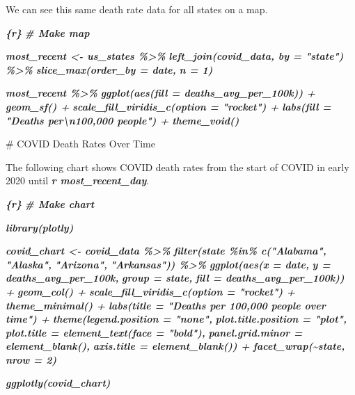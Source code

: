 \documentclass[
]{book}
\newenvironment{Shaded}{\begin{snugshade}}{\end{snugshade}}
\newcommand{\FunctionTok}[1]{\textcolor[rgb]{0.00,0.00,0.00}{#1}}
\newcommand{\InformationTok}[1]{\textcolor[rgb]{0.56,0.35,0.01}{\textbf{\textit{#1}}}}
\newcommand{\NormalTok}[1]{#1}
\begin{document}
\begin{Shaded}
\begin{Highlighting}[]
\NormalTok{We can see this same death rate data for all states on a map.}

\InformationTok{\textasciigrave{}\textasciigrave{}\textasciigrave{}\{r\}}
\InformationTok{\# Make map}

\InformationTok{most\_recent \textless{}{-} us\_states \%\textgreater{}\% }
\InformationTok{  left\_join(covid\_data, by = "state") \%\textgreater{}\% }
\InformationTok{  slice\_max(order\_by = date,}
\InformationTok{            n = 1) }

\InformationTok{most\_recent \%\textgreater{}\% }
\InformationTok{  ggplot(aes(fill = deaths\_avg\_per\_100k)) +}
\InformationTok{  geom\_sf() +}
\InformationTok{  scale\_fill\_viridis\_c(option = "rocket") +}
\InformationTok{  labs(fill = "Deaths per\textbackslash{}n100,000 people") +}
\InformationTok{  theme\_void()}
\InformationTok{\textasciigrave{}\textasciigrave{}\textasciigrave{}}

\FunctionTok{\# COVID Death Rates Over Time}

\NormalTok{The following chart shows COVID death rates from the start of COVID in early 2020 until }\InformationTok{\textasciigrave{}r most\_recent\_day\textasciigrave{}}\NormalTok{.}

\InformationTok{\textasciigrave{}\textasciigrave{}\textasciigrave{}\{r\}}
\InformationTok{\# Make chart}

\InformationTok{library(plotly)}

\InformationTok{covid\_chart \textless{}{-} covid\_data \%\textgreater{}\% }
\InformationTok{  filter(state \%in\% c("Alabama",}
\InformationTok{                      "Alaska",}
\InformationTok{                      "Arizona",}
\InformationTok{                      "Arkansas")) \%\textgreater{}\% }
\InformationTok{  ggplot(aes(x = date,}
\InformationTok{             y = deaths\_avg\_per\_100k,}
\InformationTok{             group = state,}
\InformationTok{             fill = deaths\_avg\_per\_100k)) +}
\InformationTok{  geom\_col() +}
\InformationTok{  scale\_fill\_viridis\_c(option = "rocket") +}
\InformationTok{  theme\_minimal() +}
\InformationTok{  labs(title = "Deaths per 100,000 people over time") +}
\InformationTok{  theme(legend.position = "none",}
\InformationTok{        plot.title.position = "plot",}
\InformationTok{        plot.title = element\_text(face = "bold"),}
\InformationTok{        panel.grid.minor = element\_blank(),}
\InformationTok{        axis.title = element\_blank()) +}
\InformationTok{  facet\_wrap(\textasciitilde{}state,}
\InformationTok{             nrow = 2)}


\InformationTok{ggplotly(covid\_chart)}
\InformationTok{\textasciigrave{}\textasciigrave{}\textasciigrave{}}
\end{Highlighting}
\end{Shaded}
\end{document}
